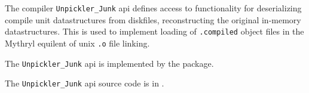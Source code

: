 
The compiler {\tt Unpickler\_Junk} api defines access to functionality for 
deserializing compile unit datastructures from diskfiles, reconstructing 
the original in-memory datastructures.  This is used to implement loading 
of {\tt .compiled} object files in the Mythryl equilent of unix {\tt .o} file 
linking.

The {\tt Unpickler\_Junk} api is implemented by the  package.

The {\tt Unpickler\_Junk} api source code is in .


